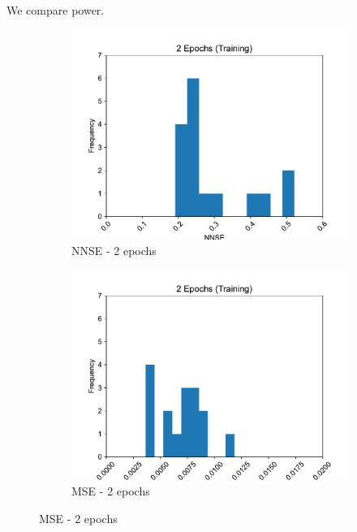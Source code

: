 \documentclass[11pt,twocolumn]{article}
\begin{document}
We compare power.


\begin{figure}[p]
     \centering
     \begin{subfigure}[b]{0.49\textwidth}
        \centering\includegraphics[width=1.0\linewidth]{images/2_training-NNSE.pdf}
        \caption{NNSE - 2 epochs}
        \label{fig:tbd1}
     \end{subfigure}
     \hfill
     \begin{subfigure}[b]{0.49\textwidth}
        \centering\includegraphics[width=1.0\linewidth]{images/2_training-MSE.pdf}
        \caption{MSE - 2 epochs}
        \label{fig:tbd2}
     \end{subfigure}
     \hfill
     \newline

\end{figure}
\end{document}
